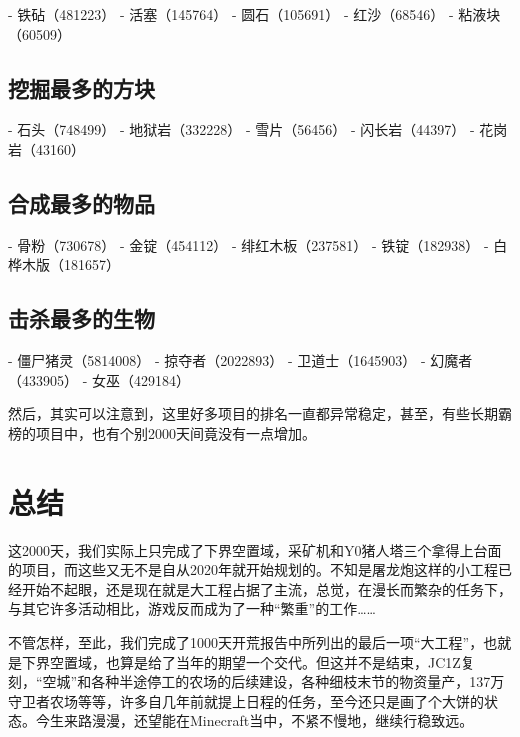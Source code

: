\documentclass[openany]{book}
\theoremstyle{remark}\newtheorem*{remark}{Remark}
\begin{document}
	- 铁砧（481223）
	- 活塞（145764）
	- 圆石（105691）
	- 红沙（68546）
	- 粘液块（60509）
	
	\subsection{挖掘最多的方块}
	
	- 石头（748499）
	- 地狱岩（332228）
	- 雪片（56456）
	- 闪长岩（44397）
	- 花岗岩（43160）
	
	\subsection{合成最多的物品}
	
	- 骨粉（730678）
	- 金锭（454112）
	- 绯红木板（237581）
	- 铁锭（182938）
	- 白桦木版（181657）
	
	\subsection{击杀最多的生物}
	
	- 僵尸猪灵（5814008）
	- 掠夺者（2022893）
	- 卫道士（1645903）
	- 幻魔者（433905）
	- 女巫（429184）
	
	然后，其实可以注意到，这里好多项目的排名一直都异常稳定，甚至，有些长期霸榜的项目中，也有个别2000天间竟没有一点增加。
	
	\section{总结}
	
	这2000天，我们实际上只完成了下界空置域，采矿机和Y0猪人塔三个拿得上台面的项目，而这些又无不是自从2020年就开始规划的。不知是屠龙炮这样的小工程已经开始不起眼，还是现在就是大工程占据了主流，总觉，在漫长而繁杂的任务下，与其它许多活动相比，游戏反而成为了一种“繁重”的工作……
	
	不管怎样，至此，我们完成了1000天开荒报告中所列出的最后一项“大工程”，也就是下界空置域，也算是给了当年的期望一个交代。但这并不是结束，JC1Z复刻，“空城”和各种半途停工的农场的后续建设，各种细枝末节的物资量产，137万守卫者农场等等，许多自几年前就提上日程的任务，至今还只是画了个大饼的状态。今生来路漫漫，还望能在Minecraft当中，不紧不慢地，继续行稳致远。
	
\end{document}
